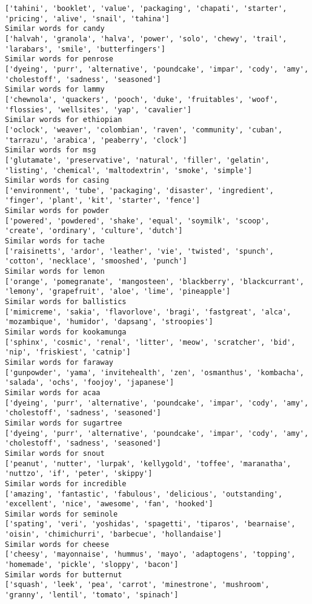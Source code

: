 \documentclass[11pt]{article}
\begin{document}
\begin{Verbatim}[commandchars=\\\{\}]
['tahini', 'booklet', 'value', 'packaging', 'chapati', 'starter', 'pricing', 'alive', 'snail', 'tahina']
Similar words for candy
['halvah', 'granola', 'halva', 'power', 'solo', 'chewy', 'trail', 'larabars', 'smile', 'butterfingers']
Similar words for penrose
['dyeing', 'purr', 'alternative', 'poundcake', 'impar', 'cody', 'amy', 'cholestoff', 'sadness', 'seasoned']
Similar words for lammy
['chewnola', 'quackers', 'pooch', 'duke', 'fruitables', 'woof', 'flossies', 'wellsites', 'yap', 'cavalier']
Similar words for ethiopian
['oclock', 'weaver', 'colombian', 'raven', 'community', 'cuban', 'tarrazu', 'arabica', 'peaberry', 'clock']
Similar words for msg
['glutamate', 'preservative', 'natural', 'filler', 'gelatin', 'listing', 'chemical', 'maltodextrin', 'smoke', 'simple']
Similar words for casing
['environment', 'tube', 'packaging', 'disaster', 'ingredient', 'finger', 'plant', 'kit', 'starter', 'fence']
Similar words for powder
['powered', 'powdered', 'shake', 'equal', 'soymilk', 'scoop', 'create', 'ordinary', 'culture', 'dutch']
Similar words for tache
['raisinetts', 'ardor', 'leather', 'vie', 'twisted', 'spunch', 'cotton', 'necklace', 'smooshed', 'punch']
Similar words for lemon
['orange', 'pomegranate', 'mangosteen', 'blackberry', 'blackcurrant', 'lemony', 'grapefruit', 'aloe', 'lime', 'pineapple']
Similar words for ballistics
['mimicreme', 'sakia', 'flavorlove', 'bragi', 'fastgreat', 'alca', 'mozambique', 'humidor', 'dapsang', 'stroopies']
Similar words for kookamunga
['sphinx', 'cosmic', 'renal', 'litter', 'meow', 'scratcher', 'bid', 'nip', 'friskiest', 'catnip']
Similar words for faraway
['gunpowder', 'yama', 'invitehealth', 'zen', 'osmanthus', 'kombacha', 'salada', 'ochs', 'foojoy', 'japanese']
Similar words for acaa
['dyeing', 'purr', 'alternative', 'poundcake', 'impar', 'cody', 'amy', 'cholestoff', 'sadness', 'seasoned']
Similar words for sugartree
['dyeing', 'purr', 'alternative', 'poundcake', 'impar', 'cody', 'amy', 'cholestoff', 'sadness', 'seasoned']
Similar words for snout
['peanut', 'nutter', 'lurpak', 'kellygold', 'toffee', 'maranatha', 'nuttzo', 'if', 'peter', 'skippy']
Similar words for incredible
['amazing', 'fantastic', 'fabulous', 'delicious', 'outstanding', 'excellent', 'nice', 'awesome', 'fan', 'hooked']
Similar words for seminole
['spating', 'veri', 'yoshidas', 'spagetti', 'tiparos', 'bearnaise', 'oisin', 'chimichurri', 'barbecue', 'hollandaise']
Similar words for cheese
['cheesy', 'mayonnaise', 'hummus', 'mayo', 'adaptogens', 'topping', 'homemade', 'pickle', 'sloppy', 'bacon']
Similar words for butternut
['squash', 'leek', 'pea', 'carrot', 'minestrone', 'mushroom', 'granny', 'lentil', 'tomato', 'spinach']

\end{Verbatim}
\end{document}
